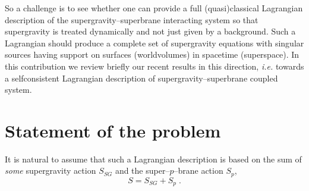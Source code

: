\documentclass[a4paper,11pt]{article}
\begin{document}
So a challenge is to see whether one can provide a full (quasi)classical 
Lagrangian description of the supergravity--superbrane interacting system 
so that supergravity is treated dynamically and not just given by a 
background. 
Such a Lagrangian should produce a complete set of 
supergravity equations with singular sources having support on 
surfaces (worldvolumes) in spacetime (superspace). 
In this contribution we review briefly 
our recent  results \cite{BAIL,BdAI1,BAIL4} 
in this direction, {\it i.e.} towards a selfconsistent Lagrangian 
description of supergravity--superbrane coupled system.


\section{Statement of the problem}

It is natural to assume that such a Lagrangian description 
is based on the sum of {\sl some} supergravity action  
$S_{SG}$ and the super--$p$--brane action $S_p$, 
\begin{equation}
  \label{S=S+S}
  S= S_{SG} + S_{p}  \; . 
\end{equation}
\end{document}
